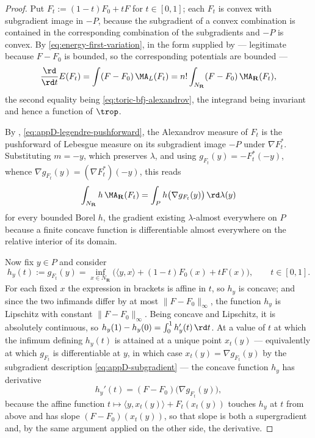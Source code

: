 \begin{proof}
Put \(F_t:=(1-t)F_0+tF\) for \(t\in[0,1]\); each \(F_t\) is convex with
subgradient image in \(-P\), because the subgradient of a convex combination
is contained in the corresponding combination of the subgradients and \(-P\)
is convex.  By \eqref{eq:energy-first-variation}, in the form supplied by
 --- legitimate because \(F-F_0\) is
bounded, so the corresponding potentials are bounded ---
\[
 \frac{\rd}{\rd t}E(F_t)
 =\int(F-F_0)\,\MA_{L}(F_t)
 =n!\int_{N_{\mathbf R}}(F-F_0)\,\MA_{\mathbf R}(F_t),
\]
the second equality being \eqref{eq:toric-bfj-alexandrov}, the integrand
being invariant and hence a function of \(\trop\).

By , \eqref{eq:appD-legendre-pushforward},
the Alexandrov measure of \(F_t\) is the pushforward of Lebesgue measure on
its subgradient image \(-P\) under \(\nabla F_t^*\).  Substituting
\(m=-y\), which preserves \(\lambda\), and using
\(g_{F_t}(y)=-F_t^*(-y)\), whence
\(\nabla g_{F_t}(y)=(\nabla F_t^*)(-y)\), this reads
\begin{equation}
\label{eq:ch26-toric-pushforward}
 \int_{N_{\mathbf R}}h\,\MA_{\mathbf R}(F_t)
 =\int_{P}h\bigl(\nabla g_{F_t}(y)\bigr)\,\rd\lambda(y)
\end{equation}
for every bounded Borel \(h\), the gradient existing \(\lambda\)-almost
everywhere on \(P\) because a finite concave function is differentiable
almost everywhere on the relative interior of its domain.

Now fix \(y\in P\) and consider
\[
 h_y(t):=g_{F_t}(y)
 =\inf_{x\in N_{\mathbf R}}
   \bigl(\langle y,x\rangle+(1-t)F_0(x)+tF(x)\bigr),
 \qquad t\in[0,1].
\]
For each fixed \(x\) the expression in brackets is affine in \(t\), so
\(h_y\) is concave; and since the two infimands differ by at most
\(\lVert F-F_0\rVert_\infty\), the function \(h_y\) is Lipschitz with
constant \(\lVert F-F_0\rVert_\infty\).  Being concave and Lipschitz, it is
absolutely continuous, so \(h_y(1)-h_y(0)=\int_0^1h_y'(t)\,\rd t\).  At a
value of \(t\) at which the infimum defining \(h_y(t)\) is attained at a
unique point \(x_t(y)\) --- equivalently at which \(g_{F_t}\) is
differentiable at \(y\), in which case \(x_t(y)=\nabla g_{F_t}(y)\) by the
subgradient description \eqref{eq:appD-subgradient} --- the concave function
\(h_y\) has derivative
\[
 h_y'(t)=(F-F_0)\bigl(\nabla g_{F_t}(y)\bigr),
\]
because the affine function \(t\mapsto\langle y,x_t(y)\rangle+F_t(x_t(y))\)
touches \(h_y\) at \(t\) from above and has slope
\((F-F_0)(x_t(y))\), so that slope is both a supergradient and, by the same
argument applied on the other side, the derivative.


\end{proof}

